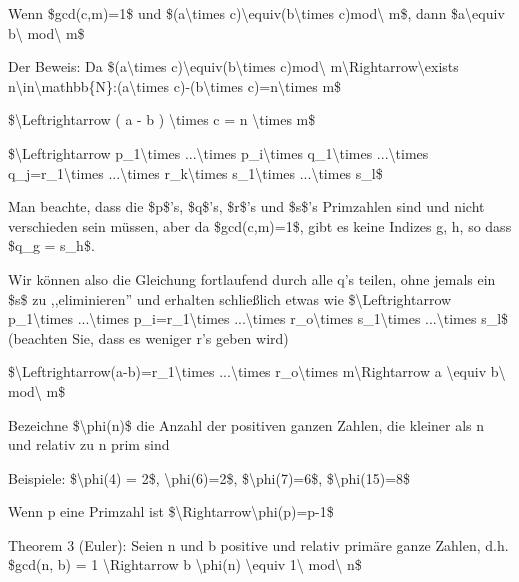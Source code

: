 \documentclass[a4paper]{article}
\begin{document}
\begin{multicols}{3}
\begin{itemize*}
\begin{itemize*}
                  \begin{itemize*} \item Wenn \$gcd(c,m)=1\$ und \$(a\textbackslash times c)\textbackslash equiv(b\textbackslash times c)mod\textbackslash{} m\$, dann \$a\textbackslash equiv b\textbackslash{} mod\textbackslash{} m\$ \item Der Beweis: Da \$(a\textbackslash times c)\textbackslash equiv(b\textbackslash times c)mod\textbackslash{} m\textbackslash Rightarrow\textbackslash exists n\textbackslash in\textbackslash mathbb\{N\}:(a\textbackslash times c)-(b\textbackslash times c)=n\textbackslash times m\$ \item \$\textbackslash Leftrightarrow ( a - b ) \textbackslash times c = n \textbackslash times m\$ \item \$\textbackslash Leftrightarrow p\_1\textbackslash times ...\textbackslash times p\_i\textbackslash times q\_1\textbackslash times ...\textbackslash times q\_j=r\_1\textbackslash times ...\textbackslash times r\_k\textbackslash times s\_1\textbackslash times ...\textbackslash times s\_l\$ \item Man beachte, dass die \$p\$'s, \$q\$'s, \$r\$'s und \$s\$'s Primzahlen sind und nicht verschieden sein müssen, aber da \$gcd(c,m)=1\$, gibt es keine Indizes g, h, so dass \$q\_g = s\_h\$. \item Wir können also die Gleichung fortlaufend durch alle q's teilen, ohne jemals ein \$s\$ zu ,,eliminieren'' und erhalten schließlich etwas wie \$\textbackslash Leftrightarrow p\_1\textbackslash times ...\textbackslash times p\_i=r\_1\textbackslash times ...\textbackslash times r\_o\textbackslash times s\_1\textbackslash times ...\textbackslash times s\_l\$ (beachten Sie, dass es weniger r's geben wird) \item \$\textbackslash Leftrightarrow(a-b)=r\_1\textbackslash times ...\textbackslash times r\_o\textbackslash times m\textbackslash Rightarrow a \textbackslash equiv b\textbackslash{} mod\textbackslash{} m\$ \end{itemize*}
                  \item Bezeichne \$\textbackslash phi(n)\$ die Anzahl der positiven ganzen Zahlen, die kleiner als n und relativ zu n prim sind
                  \begin{itemize*} \item Beispiele: \$\textbackslash phi(4) = 2\$, \textbackslash phi(6)=2\$, \$\textbackslash phi(7)=6\$, \$\textbackslash phi(15)=8\$ \item Wenn p eine Primzahl ist \$\textbackslash Rightarrow\textbackslash phi(p)=p-1\$ \end{itemize*}
            \end{itemize*}
            \item
            Theorem 3 (Euler): Seien n und b positive und relativ primäre ganze
            Zahlen, d.h. \$gcd(n, b) = 1 \textbackslash Rightarrow b
            \textbackslash phi(n) \textbackslash equiv 1\textbackslash{}
            mod\textbackslash{} n\$


\end{itemize*}
\end{multicols}
\end{document}
